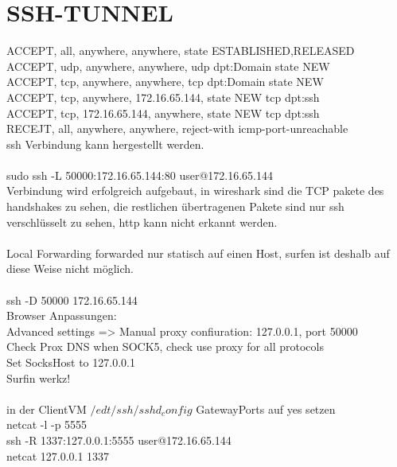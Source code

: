 \documentclass[12pt]{article}
\theoremstyle{plain}
\begin{document}
\section{SSH-TUNNEL}
ACCEPT, all, anywhere, anywhere, state ESTABLISHED,RELEASED\\
ACCEPT, udp, anywhere, anywhere, udp dpt:Domain state NEW\\
ACCEPT, tcp, anywhere, anywhere, tcp dpt:Domain state NEW\\
ACCEPT, tcp, anywhere, 172.16.65.144, state NEW tcp dpt:ssh\\
ACCEPT, tcp, 172.16.65.144, anywhere, state NEW tcp dpt:ssh\\
RECEJT, all, anywhere, anywhere, reject-with icmp-port-unreachable\\
ssh Verbindung kann hergestellt werden.\\
\\
sudo ssh -L 50000:172.16.65.144:80 user@172.16.65.144\\
Verbindung wird erfolgreich aufgebaut, in wireshark sind die TCP pakete des handshakes zu sehen, die restlichen übertragenen Pakete sind nur ssh verschlüsselt zu sehen, http kann nicht erkannt werden.\\
\\
Local Forwarding forwarded nur statisch auf einen Host, surfen ist deshalb auf diese Weise nicht möglich.\\
\\
ssh -D 50000 172.16.65.144\\
Browser Anpassungen:\\
Advanced settings => Manual proxy confiuration: 127.0.0.1, port 50000\\
Check Prox DNS when SOCK5, check use proxy for all protocols\\
Set SocksHost to 127.0.0.1\\
Surfin werkz!\\
\\
in der ClientVM $/edt/ssh/sshd_config$ GatewayPorts auf yes setzen\\
netcat -l -p 5555\\
ssh -R 1337:127.0.0.1:5555 user@172.16.65.144\\
netcat 127.0.0.1 1337\\
\end{document}

